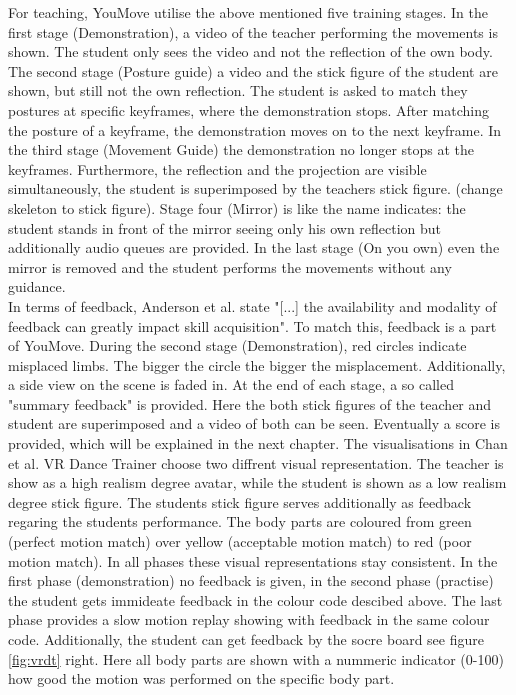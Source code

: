 For teaching, YouMove utilise the above mentioned five training stages. In the first stage (Demonstration), a video of the teacher performing the movements is shown. The student only sees the video and not the reflection of the own body. The second stage (Posture guide) a video and the stick figure of the student are shown, but still not the own reflection. The student is asked to match they postures at specific keyframes, where the demonstration stops. After matching the posture of a keyframe, the demonstration moves on to the next keyframe. In the third stage (Movement Guide) the demonstration no longer stops at the keyframes. Furthermore, the reflection and the projection are visible simultaneously, the student is superimposed by the teachers stick figure. (\todo change skeleton to stick figure). Stage four (Mirror) is like the name indicates: the student stands in front of the mirror seeing only his own reflection but additionally audio queues are provided. In the last stage (On you own) even the mirror is removed and the student performs the movements without any guidance.\\
In terms of feedback, Anderson et al. state "[...] the availability and modality of feedback can greatly impact skill acquisition". To match this, feedback is a part of YouMove. During the second stage (Demonstration), red circles indicate misplaced limbs. The bigger the circle the bigger the misplacement. Additionally, a side view on the scene is faded in. At the end of each stage, a so called "summary feedback" is provided. Here the both stick figures of the teacher and student are superimposed and a video of both can be seen. Eventually a score is provided, which will be explained in the next chapter.
The visualisations in Chan et al. VR Dance Trainer choose two diffrent visual representation. The teacher is show as a high realism degree avatar, while the student is shown as a low realism degree stick figure. The students stick figure serves additionally as feedback regaring the students performance. The body parts are coloured from green (perfect motion match) over yellow (acceptable motion match) to red (poor motion match). In all phases these visual representations stay consistent. In the first phase (demonstration) no feedback is given, in the second phase (practise) the student gets immideate feedback in the colour code descibed above. The last phase provides a slow motion replay showing with feedback in the same colour code. Additionally, the student can get feedback by the socre board see figure \ref{fig:vrdt} right. Here all body parts are shown with a nummeric indicator (0-100) how good the motion was performed on the specific body part.

